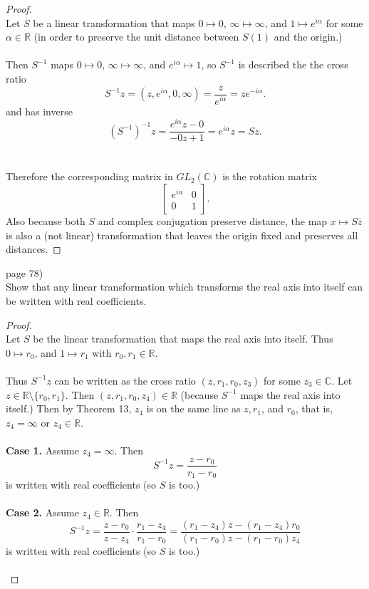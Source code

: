 \documentclass{article}
\newenvironment{problem}[2][Problem]{\begin{trivlist}
\item[\hskip \labelsep {\bfseries #1}\hskip \labelsep {\bfseries #2.}]}{\end{trivlist}}
\begin{document}
\begin{proof} \text{}\\
  Let $S$ be a linear transformation that maps $0 \mapsto 0$,
  $\infty \mapsto \infty$, and $1 \mapsto e^{i\alpha}$
  for some $\alpha \in \mathbb{R}$ (in order to preserve the unit distance
  between $S(1)$ and the origin.)\\
  \\
  Then $S^{-1}$ maps $0 \mapsto 0$, $\infty \mapsto \infty$, and
  $e^{i\alpha} \mapsto 1$, so $S^{-1}$ is described the the cross ratio \[
    S^{-1}z = (z, e^{i\alpha}, 0, \infty) =
    \frac{z}{e^{i\alpha}} = ze^{-i\alpha}.
  \] and has inverse \[
    (S^{-1})^{-1}z = \frac{e^{i\alpha}z - 0}{-0z + 1} = e^{i\alpha}z = Sz.
  \]\\
  \\
  Therefore the corresponding matrix in $GL_2(\mathbb{C})$ is the rotation matrix
  \[
     \begin{bmatrix}
       e^{i\alpha} & 0 \\
       0 & 1
     \end{bmatrix}.
  \]
  Also because both $S$ and complex conjugation preserve distance, the map
  $x \mapsto S\bar{z}$ is also a (not linear) transformation that leaves the
  origin fixed and preserves all distances.
\end{proof}
\pagebreak

\begin{problem}{4} (page 78) \\
  Show that any linear transformation which transforms the real axis into itself
  can be written with real coefficients.
\end{problem}

\begin{proof} \text{} \\
  Let $S$ be the linear transformation that maps the real axis into itself.
  Thus $0 \mapsto r_0$, and $1 \mapsto r_1$ with $r_0, r_1 \in \mathbb{R}$.\\
  \\
  Thus $S^{-1}z$ can be written as the cross ratio $(z, r_1, r_0, z_3)$ for some
  $z_3 \in \mathbb{C}$. Let $z \in \mathbb{R} \setminus \{r_0, r_1\}$.
  Then $(z, r_1, r_0, z_4) \in \mathbb{R}$
  (because $S^{-1}$ maps the real axis into itself.) Then by Theorem 13, $z_4$ is
  on the same line as $z, r_1$, and $r_0$, that is, $z_4 = \infty$ or
  $z_4 \in \mathbb{R}$.\\
  \\
  \textbf{Case 1.} Assume $z_4 = \infty$. Then \[
    S^{-1}z = \frac{z - r_0}{r_1 - r_0}
  \] is written with real coefficients (so $S$ is too.)\\
  \\
  \textbf{Case 2.} Assume $z_4 \in \mathbb{R}$. Then \[
    S^{-1}z = \frac{z - r_0}{z - z_4} \cdot \frac{r_1 - z_4}{r_1 - r_0} = \frac{(r_1 - z_4)z - (r_1 - z_4)r_0}{(r_1 - r_0)z - (r_1 - r_0)z_4}
  \] is written with real coefficients (so $S$ is too.)\\
  \\
\end{proof}
\end{document}
